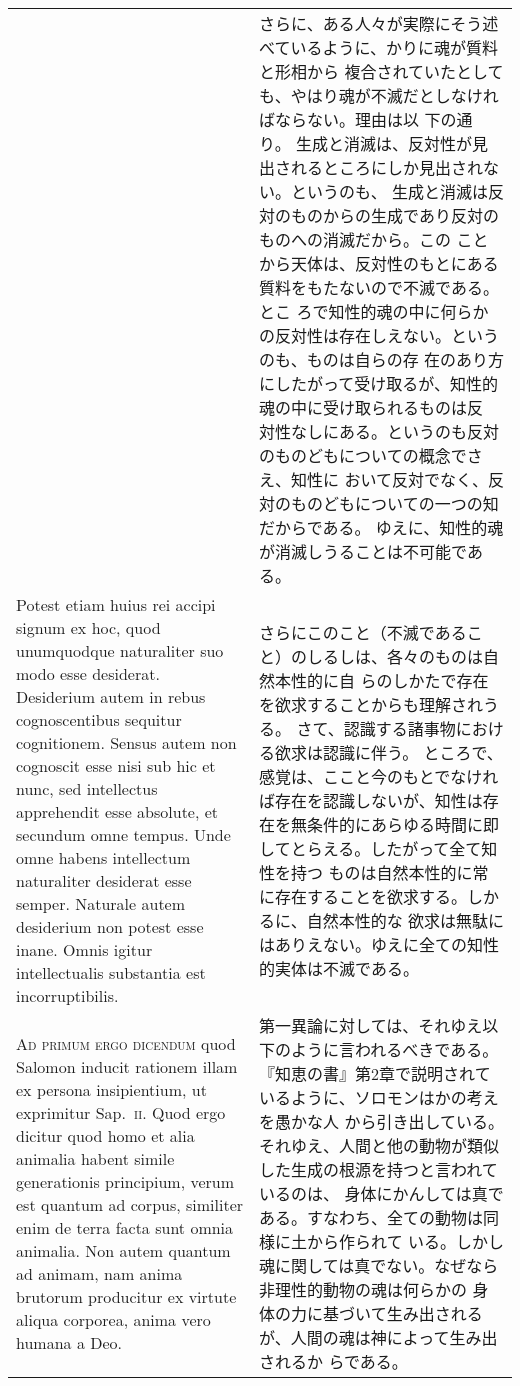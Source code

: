 \documentclass[10pt]{jsarticle} %
\begin{document}
\begin{longtable}{p{21em}p{21em}}
&

さらに、ある人々が実際にそう述べているように、かりに魂が質料と形相から
複合されていたとしても、やはり魂が不滅だとしなければならない。理由は以
下の通り。
生成と消滅は、反対性が見出されるところにしか見出されない。というのも、
 生成と消滅は反対のものからの生成であり反対のものへの消滅だから。この
 ことから天体は、反対性のもとにある質料をもたないので不滅である。とこ
 ろで知性的魂の中に何らかの反対性は存在しえない。というのも、ものは自らの存
 在のあり方にしたがって受け取るが、知性的魂の中に受け取られるものは反
 対性なしにある。というのも反対のものどもについての概念でさえ、知性に
 おいて反対でなく、反対のものどもについての一つの知だからである。
ゆえに、知性的魂が消滅しうることは不可能である。

\\

Potest etiam huius rei
accipi signum ex hoc, quod unumquodque naturaliter suo modo esse
desiderat. Desiderium autem in rebus cognoscentibus sequitur
cognitionem. Sensus autem non cognoscit esse nisi sub hic et nunc, sed
intellectus apprehendit esse absolute, et secundum omne tempus. Unde
omne habens intellectum naturaliter desiderat esse semper. Naturale
autem desiderium non potest esse inane. Omnis igitur intellectualis
substantia est incorruptibilis.


&

さらにこのこと（不滅であること）のしるしは、各々のものは自然本性的に自
 らのしかたで存在を欲求することからも理解されうる。
さて、認識する諸事物における欲求は認識に伴う。
ところで、感覚は、ここと今のもとでなければ存在を認識しないが、知性は存
 在を無条件的にあらゆる時間に即してとらえる。したがって全て知性を持つ
 ものは自然本性的に常に存在することを欲求する。しかるに、自然本性的な
 欲求は無駄にはありえない。ゆえに全ての知性的実体は不滅である。


\\



{\scshape Ad primum ergo dicendum} quod Salomon inducit rationem illam ex persona
insipientium, ut exprimitur Sap.~{\scshape ii}. Quod ergo dicitur quod homo et
alia animalia habent simile generationis principium, verum est quantum
ad corpus, similiter enim de terra facta sunt omnia animalia. Non
autem quantum ad animam, nam anima brutorum producitur ex virtute
aliqua corporea, anima vero humana a Deo. 



&

第一異論に対しては、それゆえ以下のように言われるべきである。
『知恵の書』第2章で説明されているように、ソロモンはかの考えを愚かな人
 から引き出している。
それゆえ、人間と他の動物が類似した生成の根源を持つと言われているのは、
 身体にかんしては真である。すなわち、全ての動物は同様に土から作られて
 いる。しかし魂に関しては真でない。なぜなら非理性的動物の魂は何らかの
 身体の力に基づいて生み出されるが、人間の魂は神によって生み出されるか
 らである。


\end{longtable}
\end{document}
